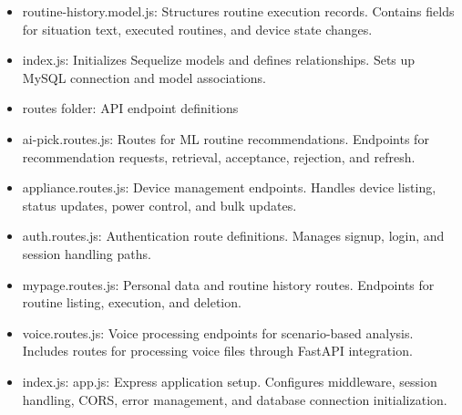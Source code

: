 \documentclass[conference]{IEEEtran}
\begin{document}
\begin{enumerate}[label=\arabic*]
\begin{itemize}[label=-]
        \item routine-history.model.js: Structures routine execution records. Contains fields for situation text, executed routines, and device state changes.
        \vspace{0.7em}

        \item index.js: Initializes Sequelize models and defines relationships. Sets up MySQL connection and model associations.
        \vspace{0.7em}

        \item routes folder: API endpoint definitions
        \vspace{0.7em}

        \item ai-pick.routes.js: Routes for ML routine recommendations. Endpoints for recommendation requests, retrieval, acceptance, rejection, and refresh.
        \vspace{0.7em}

        \item appliance.routes.js: Device management endpoints. Handles device listing, status updates, power control, and bulk updates.
        \vspace{0.7em}

        \item auth.routes.js: Authentication route definitions. Manages signup, login, and session handling paths.
        \vspace{0.7em}

        \item mypage.routes.js: Personal data and routine history routes. Endpoints for routine listing, execution, and deletion.
        \vspace{0.7em}

        \item voice.routes.js: Voice processing endpoints for scenario-based analysis. Includes routes for processing voice files through FastAPI integration.
        \vspace{0.7em}

        \item index.js: app.js: Express application setup. Configures middleware, session handling, CORS, error management, and database connection initialization.
    \end{itemize}
\end{enumerate}

\vspace{0.7em} %
\end{document}

